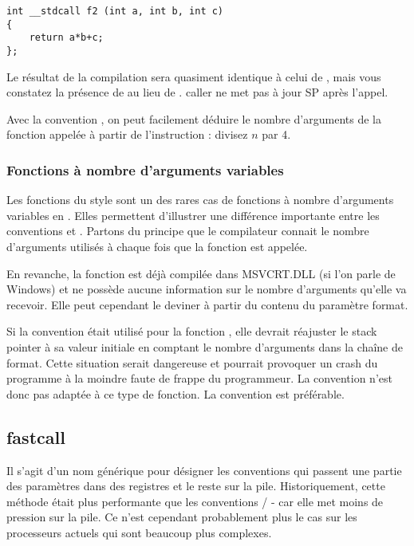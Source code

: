 \begin{lstlisting}[style=customc]
int __stdcall f2 (int a, int b, int c)
{
	return a*b+c;
};
\end{lstlisting}

Le résultat de la compilation sera quasiment identique à celui de , 
mais vous constatez la présence de  au lieu de .
\acLe \gls{caller} ne met pas à jour {SP} après l'appel.

Avec la convention , on peut facilement déduire le nombre d'arguments de la fonction 
appelée à partir de l'instruction : divisez $n$ par 4.



\subsubsection{Fonctions à nombre d'arguments variables}

Les fonctions du style \printf sont un des rares cas de fonctions à nombre d'arguments variables 
en \CCpp. Elles permettent d'illustrer une différence importante entre les conventions  et . 
Partons du principe que le compilateur connait le nombre d'arguments utilisés à chaque fois que la 
fonction \printf est appelée.

En revanche, la fonction \printf est déjà compilée dans MSVCRT.DLL (si l'on parle de Windows) et ne
possède aucune information sur le nombre d'arguments qu'elle va recevoir. Elle peut cependant le
deviner à partir du contenu du paramètre format.

Si la convention  était utilisé pour la fonction \printf, elle devrait réajuster le 
\gls{stack pointer} à sa valeur initiale en comptant le nombre d'arguments dans la chaîne de format.
Cette situation serait dangereuse et pourrait provoquer un crash du programme à la moindre faute de
frappe du programmeur.
La convention  n'est donc pas adaptée à ce type de fonction. La convention  est préférable.

\subsection{fastcall}
\label{fastcall}

Il s'agit d'un nom générique pour désigner les conventions qui passent une partie des paramètres dans
des registres et le reste sur la pile.
Historiquement, cette méthode était plus performante que les conventions / - 
car elle met moins de pression sur la pile. Ce n'est cependant probablement plus le cas sur les
processeurs actuels qui sont beaucoup plus complexes.

